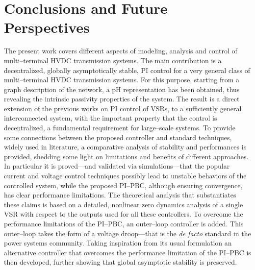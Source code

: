 \documentclass[5p,twocolumn]{elsarticle}
\def\lab{\label}
\numberwithin{equation}{section}
\begin{document}
\section{Conclusions and Future Perspectives}
\lab{sec8}
The present work covers different aspects of modeling, analysis and control of multi--terminal HVDC transmission systems. The main contribution is a decentralized, globally asymptotically stable, PI control for a very general class of  multi--terminal HVDC transmission systems. For this purpose, starting from a graph description of the network, a pH representation has been obtained, thus revealing the intrinsic passivity properties of the system. The result is a direct extension of the previous works on PI control of VSRs, to a sufficiently general interconnected system, with the important property that the control is decentralized, a fundamental requirement for large--scale systems. To provide some connections between the proposed controller and standard techniques, widely used in literature, a comparative analysis of stability and performances is provided, shedding some light on limitations and benefits of different approaches. In particular it is proved---and validated via simulations---that the popular current and voltage control techniques possibly lead to unstable behaviors of the controlled system, while the proposed PI--PBC, although ensuring convergence, has clear performance limitations. The theoretical analysis that substantiates these claims is based on a detailed, nonlinear zero dynamics analysis of a single VSR with respect to the outputs used for all these controllers. To overcome the performance limitations of the PI--PBC,  an outer--loop controller is added. This outer--loop takes the form of a voltage droop---that is the {\em de facto} standard in the power systems community. Taking inspiration from its usual formulation  an alternative controller that  overcomes the performance limitation of the PI--PBC is then developed, further showing that global asymptotic stability is preserved. 
\end{document}
